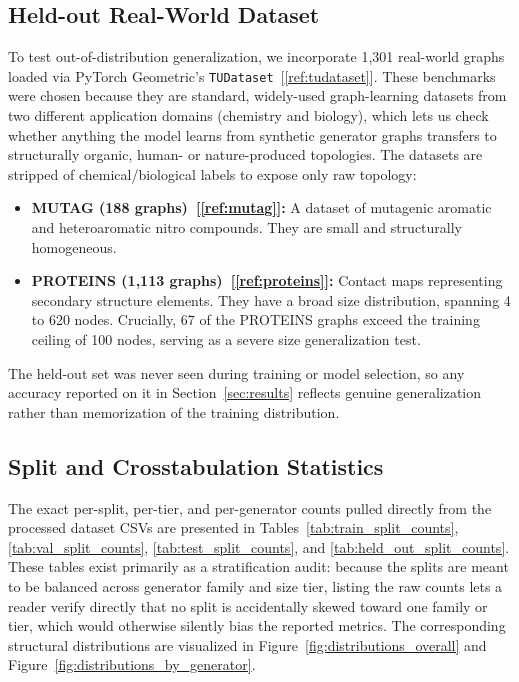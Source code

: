 \documentclass[11pt,letterpaper]{article}
\numberwithin{equation}{section}
\numberwithin{figure}{section}
\numberwithin{table}{section}
\begin{document}
\subsection{Held-out Real-World Dataset}
To test out-of-distribution generalization, we incorporate 1,301 real-world graphs loaded via PyTorch Geometric's \texttt{TUDataset}~[\ref{ref:tudataset}]. These benchmarks were chosen because they are standard, widely-used graph-learning datasets from two different application domains (chemistry and biology), which lets us check whether anything the model learns from synthetic generator graphs transfers to structurally organic, human- or nature-produced topologies. The datasets are stripped of chemical/biological labels to expose only raw topology:
\begin{itemize}
    \item \textbf{MUTAG (188 graphs)~[\ref{ref:mutag}]:} A dataset of mutagenic aromatic and heteroaromatic nitro compounds. They are small and structurally homogeneous.
    \item \textbf{PROTEINS (1,113 graphs)~[\ref{ref:proteins}]:} Contact maps representing secondary structure elements. They have a broad size distribution, spanning 4 to 620 nodes. Crucially, 67 of the PROTEINS graphs exceed the training ceiling of 100 nodes, serving as a severe size generalization test.
\end{itemize}
The held-out set was never seen during training or model selection, so any accuracy reported on it in Section~\ref{sec:results} reflects genuine generalization rather than memorization of the training distribution.

\subsection{Split and Crosstabulation Statistics}
The exact per-split, per-tier, and per-generator counts pulled directly from the processed dataset CSVs are presented in Tables~\ref{tab:train_split_counts}, \ref{tab:val_split_counts}, \ref{tab:test_split_counts}, and \ref{tab:held_out_split_counts}. These tables exist primarily as a stratification audit: because the splits are meant to be balanced across generator family and size tier, listing the raw counts lets a reader verify directly that no split is accidentally skewed toward one family or tier, which would otherwise silently bias the reported metrics. The corresponding structural distributions are visualized in Figure~\ref{fig:distributions_overall} and Figure~\ref{fig:distributions_by_generator}.
\end{document}
